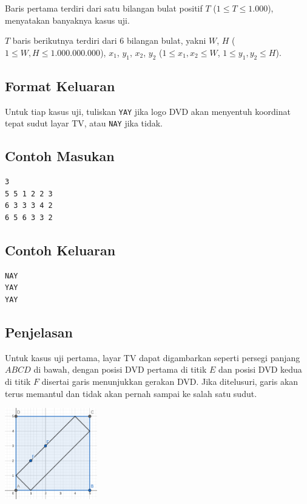\documentclass{article}
\begin{document}
Baris pertama terdiri dari satu bilangan bulat positif $T$ ($1 \leq T \leq 1.000$), menyatakan banyaknya kasus uji.

$T$ baris berikutnya terdiri dari 6 bilangan bulat, yakni $W$, $H$ ($1 \leq W, H \leq 1.000.000.000$), $x_1$, $y_1$, $x_2$, $y_2$ ($1 \leq x_1, x_2 \leq W$, $1 \leq y_1, y_2 \leq H$).

\subsection*{Format Keluaran}

Untuk tiap kasus uji, tuliskan \lstinline{YAY} jika logo DVD akan menyentuh koordinat tepat sudut layar TV, atau \lstinline{NAY} jika tidak.
\\

\begin{multicols}{2}
\subsection*{Contoh Masukan}
\begin{lstlisting}
3
5 5 1 2 2 3
6 3 3 3 4 2
6 5 6 3 3 2
\end{lstlisting}
\columnbreak
\subsection*{Contoh Keluaran}
\begin{lstlisting}
NAY
YAY
YAY
\end{lstlisting}
\vfill
\null
\end{multicols}

\subsection*{Penjelasan}
Untuk kasus uji pertama, layar TV dapat digambarkan seperti persegi panjang $ABCD$ di bawah, dengan posisi DVD pertama di titik $E$ dan posisi DVD kedua di titik $F$ disertai garis menunjukkan gerakan DVD. Jika ditelusuri, garis akan terus memantul dan tidak akan pernah sampai ke salah satu sudut.

\includegraphics[height=150px]{sample-1}
\end{document}
